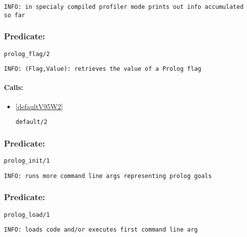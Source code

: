 {\small \begin{verbatim}
INFO: in specialy compiled profiler mode prints out info accumulated so far

\end{verbatim}}

\subsubsection{Predicate:} \label{prologV95WflagV95W2}

\begin{verbatim}
prolog_flag/2
\end{verbatim}

{\small \begin{verbatim}
INFO: (Flag,Value): retrieves the value of a Prolog flag

\end{verbatim}}
\paragraph{Calls:} 
\begin{itemize}
\item \ref{defaultV95W2} 
\begin{verbatim}
default/2
\end{verbatim}

\end{itemize}

\subsubsection{Predicate:} \label{prologV95WinitV95W1}

\begin{verbatim}
prolog_init/1
\end{verbatim}

{\small \begin{verbatim}
INFO: runs more command line args representing prolog goals

\end{verbatim}}

\subsubsection{Predicate:} \label{prologV95WloadV95W1}

\begin{verbatim}
prolog_load/1
\end{verbatim}

{\small \begin{verbatim}
INFO: loads code and/or executes first command line arg

\end{verbatim}}
